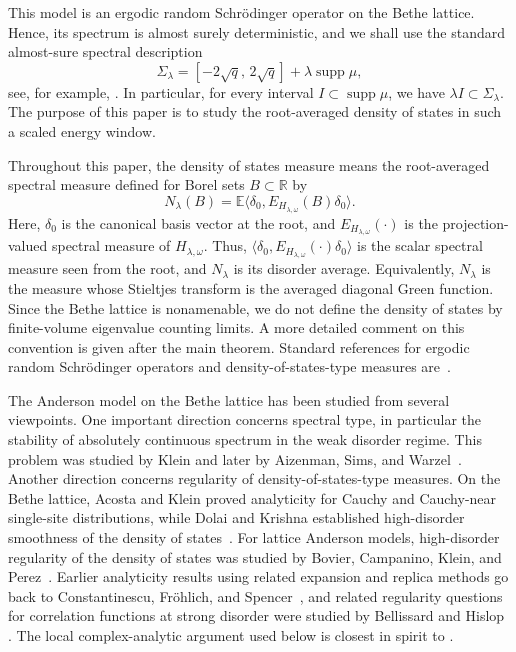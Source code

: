 \documentclass[a4paper,11pt]{article}
\begin{document}
This model is an ergodic random Schr\"odinger operator on the Bethe lattice. 
Hence, its spectrum is almost surely deterministic, 
and we shall use the standard almost-sure spectral description
$$
\Sigma_\lambda
=
[-2\sqrt q,\,2\sqrt q]+\lambda\operatorname{supp}\mu ,
$$
see, for example,
\cite{Klein1994,AizenmanWarzel2013}.
In particular, for every interval $I\subset\operatorname{supp}\mu$,
we have $\lambda I\subset\Sigma_\lambda$.
The purpose of this paper is to study the root-averaged density of states 
in such a scaled energy window.

Throughout this paper, the density of states measure means the
root-averaged spectral measure defined for Borel sets $B\subset\mathbb R$ by
$$
N_\lambda(B) = \mathbb E\langle \delta_0,E_{H_{\lambda,\omega}}(B)\delta_0\rangle.
$$
Here, $\delta_0$ is the canonical basis vector at the root, and
$E_{H_{\lambda,\omega}}(\cdot)$ is the projection-valued spectral measure
of $H_{\lambda,\omega}$. 
Thus, $\langle \delta_0,E_{H_{\lambda,\omega}}(\cdot)\delta_0\rangle$ is the
scalar spectral measure seen from the root, and $N_\lambda$ is its disorder average. 
Equivalently, $N_\lambda$ is the measure whose Stieltjes transform 
is the averaged diagonal Green function.
Since the Bethe lattice is nonamenable, we do not define the density of
states by finite-volume eigenvalue counting limits. 
A more detailed comment on this convention is given after the main theorem. 
Standard references for ergodic random Schr\"odinger operators and
density-of-states-type measures are~\cite{CyconFroeseKirschSimon1987,KirschMetzger2007}.

The Anderson model on the Bethe lattice has been studied from several viewpoints. 
One important direction concerns spectral type, in particular
the stability of absolutely continuous spectrum in the weak disorder regime. 
This problem was studied by Klein and later by Aizenman, Sims,
and Warzel~\cite{Klein1994,Klein1998,AizenmanSimsWarzel2006}.
Another direction concerns regularity of density-of-states-type measures.
On the Bethe lattice, Acosta and Klein proved analyticity for Cauchy
and Cauchy-near single-site distributions, while Dolai and Krishna
established high-disorder smoothness of the density of states~\cite{AcostaKlein1992,DolaiKrishna2023}.
For lattice Anderson models, high-disorder regularity of the density of states was studied by 
Bovier, Campanino, Klein, and Perez~\cite{BovierCampaninoKleinPerez1988}. 
Earlier analyticity results using
related expansion and replica methods go back to Constantinescu, Fr\"ohlich, and Spencer~\cite{ConstantinescuFrohlichSpencer1984}, and related regularity questions
for correlation functions at strong disorder were studied by Bellissard
and Hislop \cite{BellissardHislop2007}. 
The local complex-analytic argument used below is closest in spirit to
\cite{KaminagaKrishnaNakamura2012}.
\end{document}
